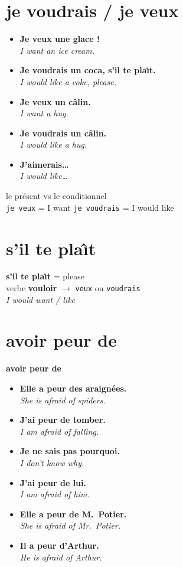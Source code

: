 \documentclass[11pt,a4paper]{article}
\newcommand{\pair}[2]{%
  \item \textbf{#1}\\
  {\color{noteblue}\textit{#2}}%
}
\begin{document}
\newpage

\section*{je voudrais / je veux}

\begin{exbox}
\begin{itemize}[leftmargin=1.2em,itemsep=0.55em]
  \pair{Je veux une glace !}
       {I want an ice cream.}
  \pair{Je voudrais un coca, s'il te pla\^{\i}t.}
       {I would like a coke, please.}
  \pair{Je veux un c\^{a}lin.}
       {I want a hug. \quad {\small\color{plum}direct}}
  \pair{Je voudrais un c\^{a}lin.}
       {I would like a hug. \quad {\small\color{plum}poli}}
  \pair{J'aimerais\ldots}
       {I would like\ldots}
\end{itemize}
\end{exbox}

\begin{rulebox}
le pr\'{e}sent \quad vs \quad le conditionnel\\[0.3em]
{\small\texttt{je veux} = I want \qquad \texttt{je voudrais} = I would like}
\end{rulebox}

\vspace{0.7em}

\section*{s'il te pla\^{\i}t}

\begin{enbox}
\textbf{s'il te pla\^{\i}t} = please\\[0.35em]
verbe \textbf{vouloir} $\rightarrow$ \texttt{veux} ou \texttt{voudrais}\\
\textit{I would want / like}
\end{enbox}

\section*{avoir peur de}

\begin{center}
{\large \textbf{avoir peur de} }
\end{center}

\begin{exbox}
\begin{itemize}[leftmargin=1.2em,itemsep=0.55em]
  \pair{Elle a peur des araign\'{e}es.}
       {She is afraid of spiders.}
  \pair{J'ai peur de tomber.}
       {I am afraid of falling.}
  \pair{Je ne sais pas pourquoi.}
       {I don't know why.}
  \pair{J'ai peur de lui.}
       {I am afraid of him.}
  \pair{Elle a peur de M.\ Potier.}
       {She is afraid of Mr.\ Potier.}
  \pair{Il a peur d'Arthur.}
       {He is afraid of Arthur.}
\end{itemize}
\end{exbox}
\end{document}

